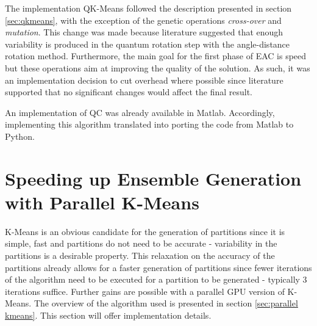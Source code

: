 The implementation QK-Means followed the description presented in section \ref{sec:qkmeans}, with the exception of the genetic operations \emph{cross-over} and \emph{mutation}.
This change was made because literature \cite{Liu2010} suggested that enough variability is produced in the quantum rotation step with the angle-distance rotation method.
Furthermore, the main goal for the first phase of EAC is speed but these operations aim at improving the quality of the solution.
As such, it was an implementation decision to cut overhead where possible since literature supported that no significant changes would affect the final result.

An implementation of QC was already available in Matlab.
Accordingly, implementing this algorithm translated into porting the code from Matlab to Python.




\section{Speeding up Ensemble Generation with Parallel K-Means}

K-Means is an obvious candidate for the generation of partitions since it is simple, fast and partitions do not need to be accurate - variability in the partitions is a desirable property.
This relaxation on the accuracy of the partitions already allows for a faster generation of partitions since fewer iterations of the algorithm need to be executed for a partition to be generated - typically 3 iterations suffice.
Further gains are possible with a parallel GPU version of K-Means.
The overview of the algorithm used is presented in section \ref{sec:parallel kmeans}.
This section will offer implementation details.

